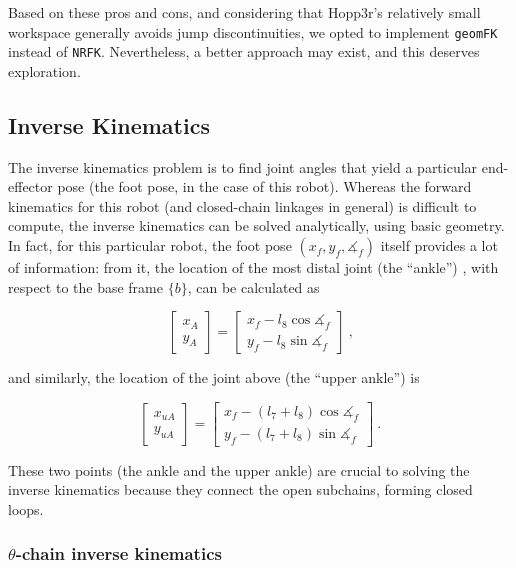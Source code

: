 \documentclass{report}
\begin{document}
Based on these pros and cons, and considering that Hopp3r's relatively small workspace generally avoids jump discontinuities, we opted to implement \texttt{geomFK} instead of \texttt{NRFK}. Nevertheless, a better approach may exist, and this deserves exploration.

\subsection[Inverse Kinematics]{Inverse Kinematics}
The inverse kinematics problem is to find joint angles that yield a particular end-effector pose (the foot pose, in the case of this robot). Whereas the forward kinematics for this robot (and closed-chain linkages in general) is difficult to compute, the inverse kinematics can be solved analytically, using basic geometry. In fact, for this particular robot, the foot pose $(x_{f}, y_{f}, \measuredangle_{f})$ itself provides a lot of information: from it, the location of the most distal joint (the ``ankle'') , with respect to the base frame $\textit{\{b\}}$, can be calculated as

\begin{equation}
\begin{bmatrix}
x_{A}\\
y_{A}
\end{bmatrix} = \begin{bmatrix}
x_{f} - l_{8}\cos{\measuredangle_{f}}\\
y_{f} - l_{8}\sin{\measuredangle_{f}}
\end{bmatrix}\ \text{,}
\end{equation}

and similarly, the location of the joint above (the ``upper ankle'') is

\begin{equation}
\begin{bmatrix}
x_{uA}\\
y_{uA}
\end{bmatrix} = \begin{bmatrix}
x_{f} - (l_{7}+l_{8})\cos{\measuredangle_{f}}\\
y_{f} - (l_{7}+l_{8})\sin{\measuredangle_{f}}
\end{bmatrix}\ \text{.}
\end{equation}

These two points (the ankle and the upper ankle) are crucial to solving the inverse kinematics because they connect the open subchains, forming closed loops.

\subsubsection[$\theta$-chain inverse kinematics]{$\theta$-chain inverse kinematics}
\end{document}
